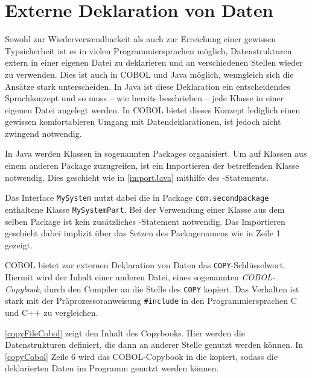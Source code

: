 \section{Externe Deklaration von Daten} \label{copy}
Sowohl zur Wiederverwendbarkeit als auch zur Erreichung einer gewissen Typsicherheit ist es in vielen Programmiersprachen möglich, Datenstrukturen extern in einer eigenen Datei zu deklarieren und an verschiedenen Stellen wieder zu verwenden. Dies ist auch in COBOL und Java möglich, wenngleich sich die Ansätze stark unterscheiden. In Java ist diese Deklaration ein entscheidendes Sprachkonzept und so muss -- wie bereits beschrieben -- jede Klasse in einer eigenen Datei angelegt werden. In COBOL bietet dieses Konzept lediglich einen gewissen komfortableren Umgang mit Datendeklarationen, ist jedoch nicht zwingend notwendig.

In Java werden Klassen in sogenannten Packages organisiert. Um auf Klassen aus einem anderen Package zuzugreifen, ist ein Importieren der betreffenden Klasse notwendig. Dies geschieht wie in \autoref{importJava} mithilfe des -Statements.

Das Interface \texttt{MySystem} nutzt dabei die in Package \texttt{com.secondpackage} enthaltene Klasse \texttt{MySystemPart}. Bei der Verwendung einer Klasse aus dem selben Package ist kein zusätzliches -Statement notwendig. Das Importieren geschieht dabei implizit über das Setzen des Packagenamens wie in Zeile 1 gezeigt.

COBOL bietet zur externen Deklaration von Daten das \texttt{COPY}-Schlüsselwort. Hiermit wird der Inhalt einer anderen Datei, eines sogenannten \textit{COBOL-Copybook}, durch den Compiler an die Stelle des \texttt{COPY} kopiert. Das Verhalten ist stark mit der Präprozessoranweisung \texttt{#include} in den Programmiersprachen C und C++ zu vergleichen.



\autoref{copyFileCobol} zeigt den Inhalt des Copybooks. Hier werden die Datenstrukturen definiert, die dann an anderer Stelle genutzt werden können. In \autoref{copyCobol} Zeile 6 wird das COBOL-Copybook in die  kopiert, sodass die deklarierten Daten im Programm genutzt werden können.

